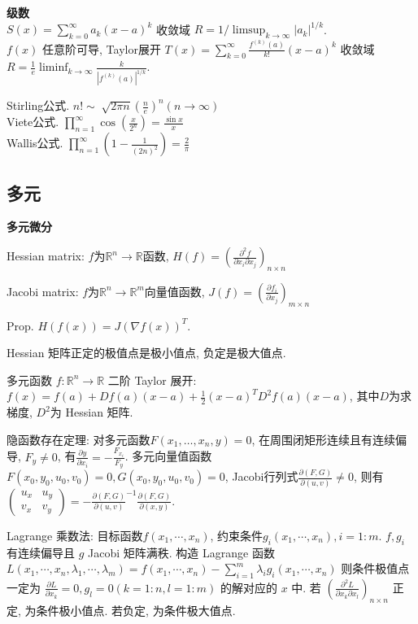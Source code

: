\documentclass[UTF8]{ctexart}
\begin{document}
\noindent \textbf{级数}\\
$S(x)=\sum_{k=0}^{\infty} a_k (x-a)^k$ 收敛域 $R = 1/ \limsup_{k\to\infty} |a_k|^{1/k}$. \\
$f(x)$ 任意阶可导, Taylor展开 $T(x)=\sum_{k=0}^{\infty} \frac{f^{(k)}(a)}{k!} (x-a)^k$ 收敛域
$R = \frac1e \liminf_{k\to\infty} \frac{k}{|f^{(k)}(a)|^{1/k}}$.

\noindent Stirling公式. $n!\sim \sqrt[]{2\pi n}\left(\frac{n}{e}\right)^n (n\to\infty )$\\
Viete公式. $\prod_{n=1}^{\infty} \cos (\frac{x}{2^n})=\frac{\sin x}{x} $\\
Wallis公式. $\prod_{n=1}^{\infty} (1-\frac{1}{(2n)^2})=\frac{2}{\pi } $\\


\subsection{多元}

\noindent \textbf{多元微分}

Hessian matrix: $f$为$\mathbb{R}^n\to\mathbb{R}$函数,
$H(f)=\left(\frac{\partial^2 f}{\partial x_i \partial x_j}\right)_{n\times n}$

Jacobi matrix: $f$为$\mathbb{R}^n\to \mathbb{R}^m$向量值函数,
$J(f)=\left(\frac{\partial f_i}{\partial x_j}\right)_{m\times n}$

Prop. $H(f(x))=J(\nabla f(x))^T$.

Hessian 矩阵正定的极值点是极小值点, 负定是极大值点.

多元函数 $f:\mathbb{R}^n\to\mathbb{R}$ 二阶 Taylor 展开:
$f(x) = f(a) + Df(a) (x-a) + \frac12 (x-a)^T D^2f(a) (x-a)$,
其中$D$为求梯度, $D^2$为 Hessian 矩阵.

隐函数存在定理:
对多元函数$F(x_1,\dots,x_n,y)=0$, 在周围闭矩形连续且有连续偏导, $F_y\neq 0$, 有$\frac{\partial y}{\partial x_i}=-\frac{F_{x_i}}{F_y}$.
多元向量值函数$F(x_0,y_0,u_0,v_0)=0, G(x_0,y_0,u_0,v_0)=0$, Jacobi行列式$\frac{\partial(F,G)}{\partial(u,v)}\neq 0$,
则有$\begin{pmatrix} u_x & u_y \\ v_x  & v_y \end{pmatrix} = -\frac{\partial(F,G)}{\partial(u,v)} ^{-1}\frac{\partial(F,G)}{\partial(x,y)}$.

Lagrange 乘数法: 目标函数$f(x_1,\cdots,x_n)$, 约束条件$g_i(x_1,\cdots,x_n),i=1:m$. $f,g_i$ 有连续偏导且 $g$ Jacobi 矩阵满秩.
构造 Lagrange 函数
$L(x_1,\cdots,x_n,\lambda_1,\cdots,\lambda_m)=f(x_1,\cdots,x_n)-\sum_{i=1}^m \lambda_i g_i(x_1,\cdots,x_n)$
则条件极值点一定为 $\frac{\partial L}{\partial x_k}=0, g_l=0 (k=1:n, l=1:m)$ 的解对应的 $x$ 中.
若 $(\frac{\partial ^2 L}{\partial x_k \partial x_l})_{n\times n}$ 正定, 为条件极小值点. 若负定, 为条件极大值点.
\end{document}
